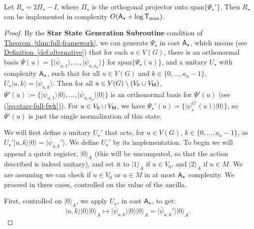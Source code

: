 \documentclass{article}
\newcommand{\eq}[1]{\hyperref[eq:#1]{(\ref*{eq:#1})}}
\newcommand{\thm}[1]{\hyperref[thm:#1]{Theorem~\ref*{thm:#1}}}
\newcommand{\defin}[1]{\hyperref[def:#1]{Definition~\ref*{def:#1}}}
\def\ket#1{{\lvert}#1\rangle}
\renewcommand{\>}{\rangle}
\newcommand{\<}{\langle}
\renewcommand{\(}{\left(}
\renewcommand{\)}{\right)}
\begin{document}
\begin{claim}\label{clm:fwk-star-unitary}
Let $R_\star =2\Pi_{\star}-I$, where $\Pi_\star$ is the orthogonal projector onto $\mathrm{span}\{\Psi_\star'\}$. Then $R_\star$ can be implemented in complexity $O({\sf A}_\star+\log{\sf T}_{\max})$. 
\end{claim}
\begin{proof}
By the \textbf{Star State Generation Subroutine} condition of \thm{full-framework}, we can generate $\Psi_\star$ in cost ${\sf A}_\star$, which means (see \defin{alternative}) that for each  $u\in V(G)$, there is an orthonormal basis $\overline{\Psi}(u)=\{\ket{\overline{\psi}_{u,1}},\dots,\ket{\overline{\psi}_{u,a_u}}\}$ for $\mathrm{span}\{\Psi_\star(u)\}$, and a unitary $U_\star$ with complexity ${\sf A}_\star$, such that for all $u\in V(G)$ and $k\in \{0,\dots,a_u-1\}$,
$U_\star\ket{u,k}=\ket{\overline{\psi}_{u,k}}.$
Then for all $u\in V(G)\setminus (V_0\cup V_{\sf M})$, $\overline{\Psi}'(u):=\{\ket{\overline{\psi}_{u,1}}\ket{0},\dots,\ket{\overline{\psi}_{u,a_u}}\ket{0}\}$ is an orthonormal basis for $\Psi'(u)$ (see \eq{stars-full-fwk}).
For $u\in V_0\cup V_{\sf M}$, we have $\Psi_{\star}'(u)=\{\ket{\psi_\star^{G'}(u)}\ket{0}\}$, so $\overline{\Psi}'(u)$ is just the single normalization of this state. 

We will first define a unitary $U_\star'$ that acts, for $u\in V(G)$, $k\in\{0,\dots,a_u-1\}$, as
$
U_\star'\ket{u,k}\ket{0}=\ket{\overline{\psi}_{u,k}'}.
$
We define $U_\star'$ by its implementation. To begin we will append a qutrit register, $\ket{0}_A$ (this will be uncomputed, so that the action described is indeed unitary), and set it to $\ket{1}_A$ if $u\in V_0$, and $\ket{2}_A$ if $u\in M$. We are assuming we can check if $u\in V_0$ or $u\in M$ in at most ${\sf A}_{\star}$ complexity. We proceed in three cases, controlled on the value of the ancilla.

\noindent First, controlled on $\ket{0}_A$, we apply $U_{\star}$, in cost ${\sf A}_\star$, to get:
$$\ket{u,k}\ket{0}\ket{0}_A\mapsto \ket{\overline{\psi}_{u,k}}\ket{0}\ket{0}_A
= \ket{\overline{\psi}_{u,k}'}\ket{0}_A.$$


\end{proof}
\end{document}
